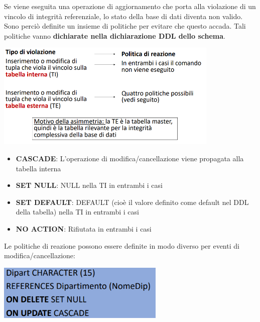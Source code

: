 \documentclass[12pt]{article}
\begin{document}
Se viene eseguita una operazione di aggiornamento che porta alla violazione di un vincolo di integrità referenziale, lo stato della base di dati diventa non valido.
Sono perciò definite un insieme di politiche per evitare che questo accada.
Tali politiche vanno \textbf{dichiarate nella dichiarazione DDL dello schema}.
\begin{center}
    \includegraphics[width = 0.80\textwidth]{Images/184.PNG}
\end{center}
\begin{itemize}
    \item \textbf{CASCADE}: L'operazione di modifica/cancellazione viene propagata alla tabella interna
    \item \textbf{SET NULL}: NULL nella TI in entrambi i casi
    \item \textbf{SET DEFAULT}: DEFAULT (cioè il valore definito come default nel DDL della tabella) nella TI in entrambi i casi
    \item \textbf{NO ACTION}: Rifiutata in entrambi i casi
\end{itemize}
Le politiche di reazione possono essere definite in modo diverso per eventi di modifica/cancellazione:
\begin{center}
    \includegraphics[width = 0.60\textwidth]{Images/185.PNG}
\end{center}
\end{document}
